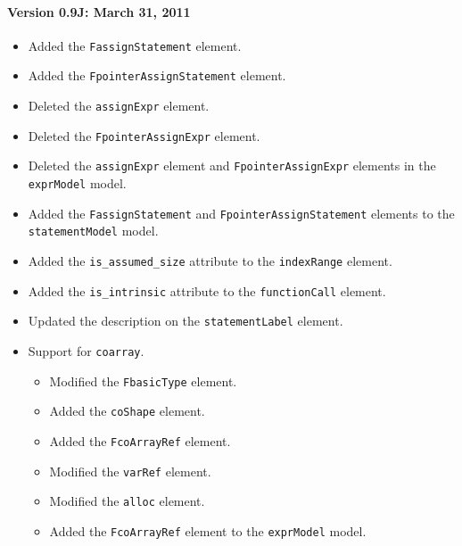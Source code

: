 \paragraph*{Version 0.9J: March 31, 2011}

\begin{itemize}
  \item Added the {\tt FassignStatement} element.
  \item Added the {\tt FpointerAssignStatement} element.
  \item Deleted the {\tt assignExpr} element.
  \item Deleted the {\tt FpointerAssignExpr} element.
  \item Deleted the {\tt assignExpr} element and {\tt FpointerAssignExpr} elements in the {\tt exprModel} model.
  \item Added the {\tt FassignStatement} and {\tt FpointerAssignStatement} elements to the {\tt statementModel} model.
  \item Added the {\tt is\_assumed\_size} attribute to the {\tt indexRange} element.
  \item Added the {\tt is\_intrinsic} attribute to the {\tt functionCall} element.
  \item Updated the description on the {\tt statementLabel} element.
  \item Support for {\tt coarray}.
  \begin{itemize}
    \item Modified the {\tt FbasicType} element.
    \item Added the {\tt coShape} element.
    \item Added the {\tt FcoArrayRef} element.
    \item Modified the {\tt varRef} element.
    \item Modified the {\tt alloc} element.
    \item Added the {\tt FcoArrayRef} element to the {\tt exprModel} model.
  \end{itemize}
\end{itemize}

